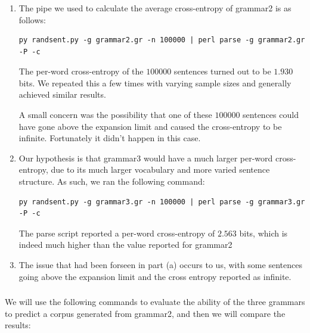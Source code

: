 \documentclass[11pt]{article}
\begin{document}
\subsubsection{}

\begin{enumerate}
      \item The pipe we used to calculate the average cross-entropy of grammar2 is as follows:
      
      \begin{verbatim}
py randsent.py -g grammar2.gr -n 100000 | perl parse -g grammar2.gr -P -c
      \end{verbatim}

      The per-word cross-entropy of the $100000$ sentences turned out to be $1.930$ bits. We repeated this a few times with varying sample sizes and generally achieved similar results.

      A small concern was the possibility that one of these $100000$ sentences could have gone above the expansion limit and caused the cross-entropy to be infinite. Fortunately it didn't happen in this case.

      \item Our hypothesis is that grammar3 would have a much larger per-word cross-entropy, due to its much larger vocabulary and more varied sentence structure. As such, we ran the following command: 
      
      \begin{verbatim}
py randsent.py -g grammar3.gr -n 100000 | perl parse -g grammar3.gr -P -c
      \end{verbatim}

      The parse script reported a per-word cross-entropy of $2.563$ bits, which is indeed much higher than the value reported for grammar2

      \item The issue that had been forseen in part (a) occurs to us, with some sentences going above the expansion limit and the cross entropy reported as infinite.

\end{enumerate}

\subsubsection{}

We will use the following commands to evaluate the ability of the three grammars to predict a corpus generated from grammar2, and then we will compare the results:
\end{document}
